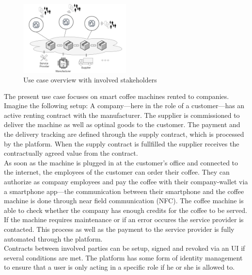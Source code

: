\documentclass[conference]{IEEEtran}
\begin{document}
\begin{figure}[hbt]
 \centering
 \includegraphics[width=0.5\textwidth]{media/overview.png}
 \caption{Use case overview with involved stakeholders}
 \label{fig:overview}
\end{figure}

The present use case focuses on smart coffee machines rented to companies. Imagine the following setup: A company---here in the role of a customer---has an active renting contract with the manufacturer. The supplier is commissioned to deliver the machine as well as optinal goods to the customer. The payment and the delivery tracking are defined through the supply contract, which is processed by the platform. When the supply contract is fullfilled the supplier receives the contractually agreed value from the contract.\\
As soon as the machine is plugged in at the customer's office and connected to the internet, the employees of the customer can order their coffee. They can authorize as company employees and pay the coffee with their company-wallet via a smartphone app---the communication between their smartphone and the coffee machine is done through near field communication (NFC). The coffee machine is able to check whether the company has enough credits for the coffee to be served. If the machine requires maintenance or if an error occures the service provider is contacted. This process as well as the payment to the service provider is fully automated through the platform.\\
Contracts between involved parties can be setup, signed and revoked via an UI if several conditions are met. The platform has some form of identity management to ensure that a user is only acting in a specific role if he or she is allowed to. 
\end{document}
